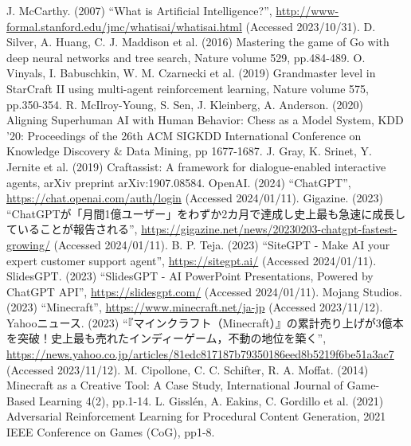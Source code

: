 \begin{thebibliography}{99}
    J. McCarthy. (2007) 
    ``What is Artificial Intelligence?'', 
    \url{http://www-formal.stanford.edu/jmc/whatisai/whatisai.html} (Accessed 2023/10/31).
    D. Silver, A. Huang, C. J. Maddison et al. (2016) 
    Mastering the game of Go with deep neural networks and tree search, 
    Nature volume 529, pp.484-489.
    O. Vinyals, I. Babuschkin, W. M. Czarnecki et al. (2019) 
    Grandmaster level in StarCraft II using multi-agent reinforcement learning, 
    Nature volume 575, pp.350-354.
    R. McIlroy-Young, S. Sen, J. Kleinberg, A. Anderson. (2020) 
    Aligning Superhuman AI with Human Behavior: Chess as a Model System,
    KDD '20: Proceedings of the 26th ACM SIGKDD International Conference on Knowledge Discovery \& Data Mining, pp 1677-1687.
    J. Gray, K. Srinet, Y. Jernite et al. (2019) 
    Craftassist: A framework for dialogue-enabled interactive agents,
    arXiv preprint arXiv:1907.08584.
    OpenAI. (2024)
    ``ChatGPT'',
    \url{https://chat.openai.com/auth/login} (Accessed 2024/01/11).
    Gigazine. (2023)
    ``ChatGPTが「月間1億ユーザー」をわずか2カ月で達成し史上最も急速に成長していることが報告される'',
    \url{https://gigazine.net/news/20230203-chatgpt-fastest-growing/} (Accessed 2024/01/11).
    B. P. Teja. (2023)
    ``SiteGPT - Make AI your expert customer support agent'',
    \url{https://sitegpt.ai/} (Accessed 2024/01/11).
    SlidesGPT. (2023)
    ``SlidesGPT - AI PowerPoint Presentations, Powered by ChatGPT API'',
    \url{https://slidesgpt.com/} (Accessed 2024/01/11).
    Mojang Studios. (2023)
    ``Minecraft'', 
    \url{https://www.minecraft.net/ja-jp} (Accessed 2023/11/12).
    Yahooニュース. (2023)
    ``『マインクラフト（Minecraft）』の累計売り上げが3億本を突破！史上最も売れたインディーゲーム，不動の地位を築く'',
    \url{https://news.yahoo.co.jp/articles/81edc817187b79350186eed8b5219f6be51a3ac7} (Accessed 2023/11/12).
	M. Cipollone, C. C. Schifter, R. A. Moffat. (2014) 
    Minecraft as a Creative Tool: A Case Study, 
    International Journal of Game-Based Learning 4(2), pp.1-14.
	L. Gisslén, A. Eakins, C. Gordillo et al. (2021)
    Adversarial Reinforcement Learning for Procedural Content Generation,
    2021 IEEE Conference on Games (CoG), pp1-8.

\end{thebibliography}
